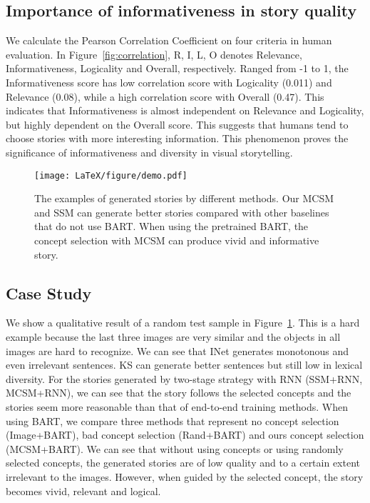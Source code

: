 \subsection{Importance of informativeness in story quality}
We calculate the Pearson Correlation Coefficient on four criteria in human evaluation. 
In Figure~\ref{fig:correlation}, R,  I,  L,  O  denotes Relevance, Informativeness, Logicality and Overall, respectively. 
Ranged from -1 to 1, the Informativeness score has low correlation score with Logicality (0.011) and Relevance (0.08), while a high correlation score with Overall (0.47).
This indicates that Informativeness is almost independent on Relevance and Logicality, but highly dependent on the Overall score. This suggests that humans tend to choose stories with more interesting information. This phenomenon proves the significance of informativeness and diversity in visual storytelling.



\begin{figure}[!t]
\centering
\texttt{[image: LaTeX/figure/demo.pdf]}
\caption{The examples of generated stories by different methods. Our MCSM and SSM can generate better stories compared with other baselines that do not use BART. When using the pretrained BART, the concept selection with MCSM can produce vivid and informative story.}
\label{fig:demo}
\end{figure}


\subsection{Case Study}
We show a qualitative result of a random test sample in Figure~\ref{fig:demo}. This is a hard example because the last three images are very similar and the objects in all images are hard to recognize. We can see that INet generates monotonous and even irrelevant sentences. KS can generate better sentences but still low in lexical diversity. For the stories generated by two-stage strategy with RNN (SSM+RNN, MCSM+RNN), we can see that the story follows the selected concepts and the stories seem more reasonable than that of end-to-end training methods. 
When using BART, we compare three methods that represent no concept selection (Image+BART), bad concept selection (Rand+BART) and ours concept selection (MCSM+BART).
We can see that without using concepts or using randomly selected concepts, the generated stories are of low quality and to a certain extent irrelevant to the images. However, when guided by the selected concept, the story becomes vivid, relevant and logical. 

